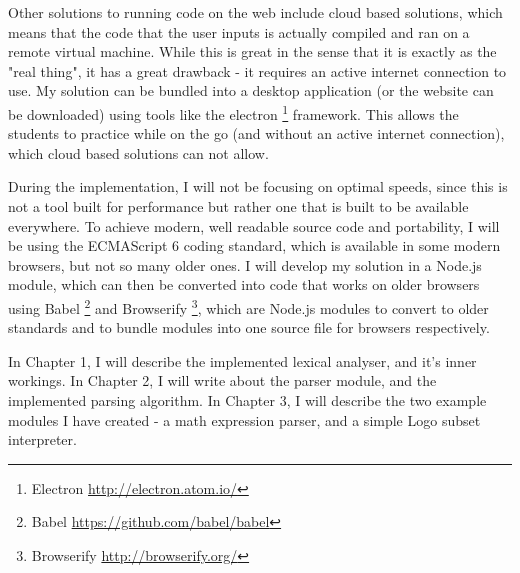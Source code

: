 Other solutions to running code on the web include cloud based solutions, which means that the code that the user inputs is actually compiled and ran on a remote virtual machine. While this is great in the sense that it is exactly as the "real thing", it has a great drawback - it requires an active internet connection to use. My solution can be bundled into a desktop application (or the website can be downloaded) using tools like the electron \footnote{Electron \url{http://electron.atom.io/}} framework. This allows the students to practice while on the go (and without an active internet connection), which cloud based solutions can not allow.

During the implementation, I will not be focusing on optimal speeds, since this is not a tool built for performance but rather one that is built to be available everywhere. To achieve modern, well readable source code and portability, I will be using the ECMAScript 6 coding standard, which is available in some modern browsers, but not so many older ones. I will develop my solution in a Node.js module, which can then be converted into code that works on older browsers using Babel \footnote{Babel \url{https://github.com/babel/babel}} and Browserify \footnote{Browserify \url{http://browserify.org/}}, which are Node.js modules to convert to older standards and to bundle modules into one source file for browsers respectively.

In Chapter 1, I will describe the implemented lexical analyser, and it's inner workings. In Chapter 2, I will write about the parser module, and the implemented parsing algorithm. In Chapter 3, I will describe the two example modules I have created - a math expression parser, and a simple Logo subset interpreter.
